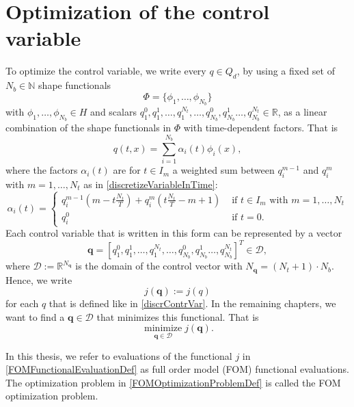 \section{Optimization of the control variable}

To optimize the control variable, we write every $q\in Q_d$, by using a fixed set of $N_b\in\mathbb{N}$ shape functionals
\begin{equation}
\label{basisFuncionsList}
\Phi=\{\phi_1,\dotsc,\phi_{N_b}\}
\end{equation}
 with $\phi_1,\dotsc,\phi_{N_b}\in H$ and scalars $q_1^0,q_1^1,\dotsc,q_1^{N_t},\dotsc,q_{N_b}^0,q_{N_b}^1\dotsc,q_{N_b}^{N_t}\in\mathbb{R}$, as a linear combination of the shape functionals in $\Phi$ with time-dependent factors. That is
\begin{equation}
\label{discrContrVar}
q(t,x) = \sum_{i=1}^{N_b}\alpha_i(t)\phi_i(x),
\end{equation} 
where the factors $\alpha_i(t)$ are for $t\in I_m$ a weighted sum between $q^{m-1}_i$ and $q^m_i$ with $m=1,\dotsc,N_t$ as in \eqref{discretizeVariableInTime}:
\begin{displaymath}
\alpha_i(t)=\begin{cases}
q_i^{m-1}\left(m-t\frac{N_t}{T}\right) + q_i^m\left(t\frac{N_t}{T}-m+1\right) & \text{ if $t\in I_m$ with $m=1,\dotsc,N_t$}\\
q_i^0 & \text{ if $t=0$.}
\end{cases}
\end{displaymath}
Each control variable that is written in this form can be represented by a vector
\begin{displaymath}
\mathbf{q}=\left[q_1^0,q_1^1,\dotsc,q_1^{N_t},\dotsc,q_{N_b}^0,q_{N_b}^1\dotsc,q_{N_b}^{N_t}\right]^T\in\mathcal{D},
\end{displaymath} 
where $\mathcal{D}:=\mathbb{R}^{N_\mathbf{q}}$ is the domain of the control vector with $N_\mathbf{q} = (N_t+1)\cdot N_b$. Hence, we write
\begin{equation}
\label{FOMFunctionalEvaluationDef}
j(\mathbf{q}):=j(q)
\end{equation}
for each $q$ that is defined like in \eqref{discrContrVar}. In the remaining chapters, we want to find a $\mathbf{q}\in\mathcal{D}$ that minimizes this functional. That is
\begin{equation}
\label{FOMOptimizationProblemDef}
\operatorname*{minimize}_{\mathbf{q}\in\mathcal{D}}j(\mathbf{q}).
\end{equation}

In this thesis, we refer to evaluations of the functional $j$ in \eqref{FOMFunctionalEvaluationDef} as full order model (FOM) functional evaluations. The optimization problem in \eqref{FOMOptimizationProblemDef} is called the FOM optimization problem.

